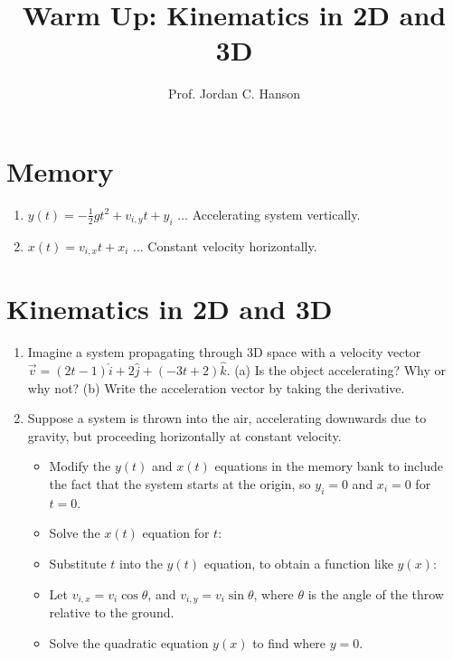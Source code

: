 \documentclass{article}
\begin{document}
\title{Warm Up: Kinematics in 2D and 3D}
\author{Prof. Jordan C. Hanson}

\maketitle

\section{Memory}

\begin{enumerate}
\item $y(t) = -\frac{1}{2}g t^2 + v_{i,y} t + y_i$ ... Accelerating system vertically.
\item $x(t) = v_{i,x} t + x_i$ ... Constant velocity horizontally.
\end{enumerate}

\section{Kinematics in 2D and 3D}

\begin{enumerate}
\item Imagine a system propagating through 3D space with a velocity vector $\vec{v} = (2t-1)\hat{i} + 2\hat{j} + (-3t+2)\hat{k}$.  (a) Is the object accelerating?  Why or why not? (b) Write the acceleration vector by taking the derivative. \\ \vspace{2cm}
\item Suppose a system is thrown into the air, accelerating downwards due to gravity, but proceeding horizontally at constant velocity.
\begin{itemize}
\item Modify the $y(t)$ and $x(t)$ equations in the memory bank to include the fact that the system starts at the origin, so $y_i = 0$ and $x_i = 0$ for $t = 0$. \\ \vspace{1cm}
\item Solve the $x(t)$ equation for $t$: \\ \vspace{1cm}
\item Substitute $t$ into the $y(t)$ equation, to obtain a function like $y(x)$: \\ \vspace{1.5cm}
\item Let $v_{i,x} = v_i \cos\theta$, and $v_{i,y} = v_i \sin\theta$, where $\theta$ is the angle of the throw relative to the ground. \\ \vspace{1cm}
\item Solve the quadratic equation $y(x)$ to find where $y = 0$.
\end{itemize}
\end{enumerate}
\end{document}
